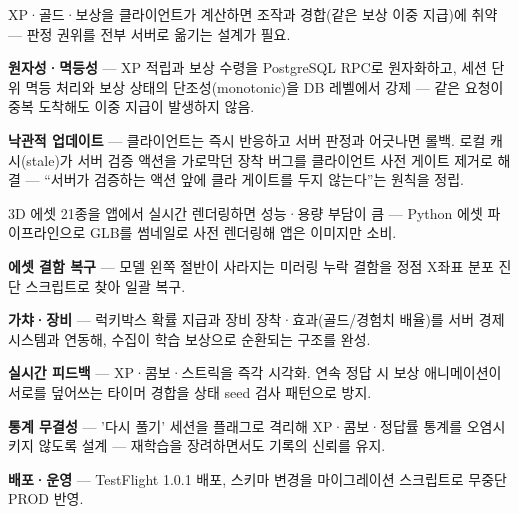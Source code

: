\begin{substeps}
  \item XP·골드·보상을 클라이언트가 계산하면 조작과 경합(같은 보상 이중 지급)에 취약 --- 판정 권위를 전부 서버로 옮기는 설계가 필요.
  \item \textbf{원자성·멱등성} --- XP 적립과 보상 수령을 PostgreSQL RPC로 원자화하고, 세션 단위 멱등 처리와 보상 상태의 단조성(monotonic)을 DB 레벨에서 강제 --- 같은 요청이 중복 도착해도 이중 지급이 발생하지 않음.
  \item \textbf{낙관적 업데이트} --- 클라이언트는 즉시 반응하고 서버 판정과 어긋나면 롤백. 로컬 캐시(stale)가 서버 검증 액션을 가로막던 장착 버그를 클라이언트 사전 게이트 제거로 해결 --- ``서버가 검증하는 액션 앞에 클라 게이트를 두지 않는다''는 원칙을 정립.
\end{substeps}

\begin{substeps}
  \item 3D 에셋 21종을 앱에서 실시간 렌더링하면 성능·용량 부담이 큼 --- Python 에셋 파이프라인으로 GLB를 썸네일로 사전 렌더링해 앱은 이미지만 소비.
  \item \textbf{에셋 결함 복구} --- 모델 왼쪽 절반이 사라지는 미러링 누락 결함을 정점 X좌표 분포 진단 스크립트로 찾아 일괄 복구.
  \item \textbf{가챠·장비} --- 럭키박스 확률 지급과 장비 장착·효과(골드/경험치 배율)를 서버 경제 시스템과 연동해, 수집이 학습 보상으로 순환되는 구조를 완성.
\end{substeps}

\begin{substeps}
  \item \textbf{실시간 피드백} --- XP·콤보·스트릭을 즉각 시각화. 연속 정답 시 보상 애니메이션이 서로를 덮어쓰는 타이머 경합을 상태 seed 검사 패턴으로 방지.
  \item \textbf{통계 무결성} --- '다시 풀기' 세션을 플래그로 격리해 XP·콤보·정답률 통계를 오염시키지 않도록 설계 --- 재학습을 장려하면서도 기록의 신뢰를 유지.
  \item \textbf{배포·운영} --- TestFlight 1.0.1 배포, 스키마 변경을 마이그레이션 스크립트로 무중단 PROD 반영.
\end{substeps}
